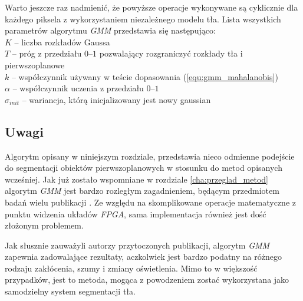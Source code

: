 Warto jeszcze raz nadmienić, że powyższe operacje wykonywane są cyklicznie dla każdego piksela z wykorzystaniem niezależnego modelu tła. Lista wszystkich parametrów algorytmu \textit{GMM} przedstawia się następująco: \\
\-\hspace{1cm} $K$ -- liczba rozkładów Gaussa\\
\-\hspace{1cm} $T$ -- próg z przedziału $0$--$1$ pozwalający rozgraniczyć rozkłady tła i pierwszoplanowe\\
\-\hspace{1cm} $k$ -- współczynnik używany w teście dopasowania (\ref{equ:gmm_mahalanobis})\\
\-\hspace{1cm} $\alpha$ -- współczynnik uczenia z przedziału $0$--$1$\\
\-\hspace{1cm} $\sigma_{init}$ -- wariancja, którą inicjalizowany jest nowy gaussian\\ 


\subsection{Uwagi}
\label{subsec:gmm_uwagi}

Algorytm opisany w niniejszym rozdziale, przedstawia nieco odmienne podejście do segmentacji obiektów pierwszoplanowych w stosunku do metod opisanych wcześniej. Jak już zostało wspomniane w rozdziale \ref{cha:przeglad_metod} algorytm \textit{GMM} jest bardzo rozległym zagadnieniem, będącym przedmiotem badań wielu publikacji \cite{Stauffer_Grimson_99, Genovese_Napoli_13, piszczek_15, wang_14}. Ze względu na skomplikowane operacje matematyczne z punktu widzenia układów \textit{FPGA}, sama implementacja również jest dość złożonym problemem.

Jak słusznie zauważyli autorzy przytoczonych publikacji, algorytm \textit{GMM} zapewnia zadowalające rezultaty, aczkolwiek jest bardzo podatny na różnego rodzaju zakłócenia, szumy i zmiany oświetlenia. Mimo to w większość przypadków, jest to metoda, mogąca z powodzeniem zostać wykorzystana jako samodzielny system segmentacji tła.  


